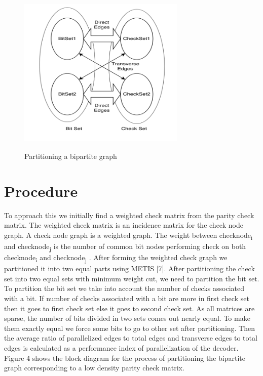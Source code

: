 \documentclass[twopage,12pt,a4paper]{report}
\begin{document}
\begin{raggedright}
 \begin{figure}[h]
 \begin{center}
    \includegraphics[height=8cm,width=8cm]{partition1.jpg}
    \caption{Partitioning a bipartite graph} 
 \end{center}
\end{figure}


\section{Procedure}
To approach this we initially find a weighted check matrix from the parity check matrix. The weighted check matrix is an incidence matrix for the check node graph. A check node graph is a weighted graph. The weight between checknode\textsubscript{i} and checknode\textsubscript{j} is the number of common bit nodes performing check on both checknode\textsubscript{i} and checknode\textsubscript{j} . After forming the
weighted check graph we partitioned it into two equal parts using METIS [7]. After partitioning the check set into two equal sets with minimum weight cut, we need to partition the bit set. To partition the bit set we take into account the number of checks associated with a bit. If number of checks associated with a bit are more in first check set then it goes to first check set else it goes to second check set. As all matrices are sparse, the number of bits divided in two sets comes out nearly equal. To make them exactly equal we force some bits to go to other set after partitioning. Then the average ratio of parallelized edges to total edges and transverse edges to total edges is calculated as a performance index of parallelization of the
decoder. Figure 4 shows the block diagram for the process of partitioning the bipartite graph corresponding to a low density parity check matrix.



\end{raggedright}
\end{document}
